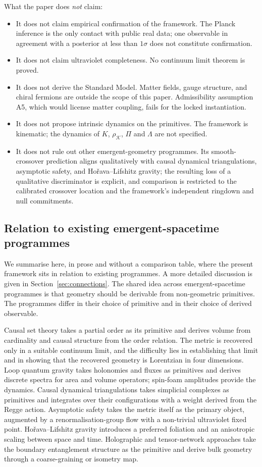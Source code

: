 ﻿\documentclass[12pt,a4paper]{article}
\theoremstyle{definition}
\begin{document}
What the paper does \emph{not} claim:
\begin{itemize}
  \item It does not claim empirical confirmation of the framework. The Planck inference is the only contact with public real data; one observable in agreement with a posterior at less than $1\sigma$ does not constitute confirmation.
  \item It does not claim ultraviolet completeness. No continuum limit theorem is proved.
  \item It does not derive the Standard Model. Matter fields, gauge structure, and chiral fermions are outside the scope of this paper. Admissibility assumption A5, which would license matter coupling, fails for the locked instantiation.
  \item It does not propose intrinsic dynamics on the primitives. The framework is kinematic; the dynamics of $K$, $\rho_{\mathcal{K}}$, $\Pi$ and $\Lambda$ are not specified.
  \item It does not rule out other emergent-geometry programmes. Its smooth-crossover prediction aligns qualitatively with causal dynamical triangulations, asymptotic safety, and Ho\v{r}ava--Lifshitz gravity; the resulting loss of a qualitative discriminator is explicit, and comparison is restricted to the calibrated crossover location and the framework's independent ringdown and null commitments.
\end{itemize}

\subsection{Relation to existing emergent-spacetime programmes}
\label{sec:intro_relation}

We summarise here, in prose and without a comparison table, where the present framework sits in relation to existing programmes. A more detailed discussion is given in Section~\ref{sec:connections}. The shared idea across emergent-spacetime programmes is that geometry should be derivable from non-geometric primitives. The programmes differ in their choice of primitive and in their choice of derived observable.

Causal set theory takes a partial order as its primitive and derives volume from cardinality and causal structure from the order relation. The metric is recovered only in a suitable continuum limit, and the difficulty lies in establishing that limit and in showing that the recovered geometry is Lorentzian in four dimensions. Loop quantum gravity takes holonomies and fluxes as primitives and derives discrete spectra for area and volume operators; spin-foam amplitudes provide the dynamics. Causal dynamical triangulations takes simplicial complexes as primitives and integrates over their configurations with a weight derived from the Regge action. Asymptotic safety takes the metric itself as the primary object, augmented by a renormalisation-group flow with a non-trivial ultraviolet fixed point. Ho\v{r}ava--Lifshitz gravity introduces a preferred foliation and an anisotropic scaling between space and time. Holographic and tensor-network approaches take the boundary entanglement structure as the primitive and derive bulk geometry through a coarse-graining or isometry map.
\end{document}
